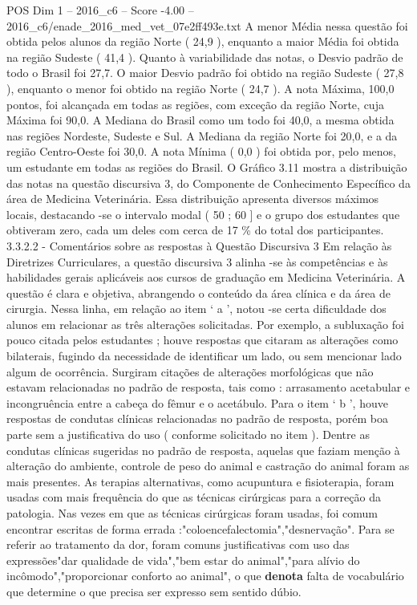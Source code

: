 \begin{textsample}{POS Dim 1 – 2016\_c6 – Score -4.00 – 2016\_c6/enade\_2016\_med\_vet\_07e2ff493e.txt}
A menor Média nessa questão foi obtida pelos alunos da região Norte ( 24,9 ), enquanto a maior Média foi obtida na região Sudeste ( 41,4 ).
Quanto à variabilidade das notas, o Desvio padrão de todo o Brasil foi 27,7.
O maior Desvio padrão foi obtido na região Sudeste ( 27,8 ), enquanto o menor foi obtido na região Norte ( 24,7 ).
A nota Máxima, 100,0 pontos, foi alcançada em todas as regiões, com exceção da região Norte, cuja Máxima foi 90,0.
A Mediana do Brasil como um todo foi 40,0, a mesma obtida nas regiões Nordeste, Sudeste e Sul.
A Mediana da região Norte foi 20,0, e a da região Centro-Oeste foi 30,0.
A nota Mínima ( 0,0 ) foi obtida por, pelo menos, um estudante em todas as regiões do Brasil.
O Gráfico 3.11 mostra a distribuição das notas na questão discursiva 3, do Componente de Conhecimento Específico da área de Medicina Veterinária.
Essa distribuição apresenta diversos máximos locais, destacando -se o intervalo modal ( 50 ; 60 ] e o grupo dos estudantes que obtiveram zero, cada um deles com cerca de 17 \% do total dos participantes. 3.3.2.2 - Comentários sobre as respostas à Questão Discursiva 3 Em relação às Diretrizes Curriculares, a questão discursiva 3 alinha -se às competências e às habilidades gerais aplicáveis aos cursos de graduação em Medicina Veterinária.
A questão é clara e objetiva, abrangendo o conteúdo da área clínica e da área de cirurgia.
Nessa linha, em relação ao item ‘ a ’, notou -se certa dificuldade dos alunos em relacionar as três alterações solicitadas.
Por exemplo, a subluxação foi pouco citada pelos estudantes ; houve respostas que citaram as alterações como bilaterais, fugindo da necessidade de identificar um lado, ou sem mencionar lado algum de ocorrência.
Surgiram citações de alterações morfológicas que não estavam relacionadas no padrão de resposta, tais como : arrasamento acetabular e incongruência entre a cabeça do fêmur e o acetábulo.
Para o item ‘ b ’, houve respostas de condutas clínicas relacionadas no padrão de resposta, porém boa parte sem a justificativa do uso ( conforme solicitado no item ).
Dentre as condutas clínicas sugeridas no padrão de resposta, aquelas que faziam menção à alteração do ambiente, controle de peso do animal e castração do animal foram as mais presentes.
As terapias alternativas, como acupuntura e fisioterapia, foram usadas com mais frequência do que as técnicas cirúrgicas para a correção da patologia.
Nas vezes em que as técnicas cirúrgicas foram usadas, foi comum encontrar escritas de forma errada :"coloencefalectomia","desnervação".
Para se referir ao tratamento da dor, foram comuns justificativas com uso das expressões"dar qualidade de vida","bem estar do animal","para alívio do incômodo","proporcionar conforto ao animal", o que \textbf{denota} falta de vocabulário que determine o que precisa ser expresso sem sentido dúbio.

\end{textsample}
